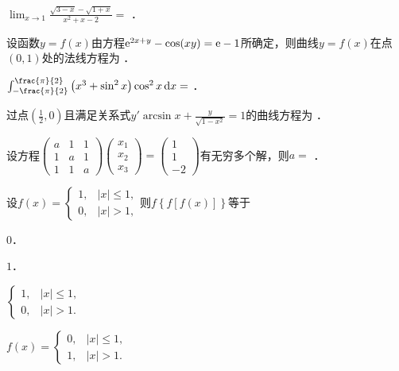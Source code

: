 \documentclass[plain,noanswer,medmath]{../../template/jnuexam}
\begin{document}






\begin{problem}
$\lim_{x \to 1} \frac{\sqrt{3 - x} - \sqrt{1 + x}}{x^2 + x - 2} =$ \fillin{}．
\end{problem}


\begin{problem}
设函数$y = f(x)$由方程$\mathrm{e}^{2x + y} - \cos(xy) = \mathrm{e} - 1$所确定，则曲线$y = f(x)$在点$(0,1)$处的法线方程为 \fillin{}．
\end{problem}


\begin{problem}
$\int_{- \frac{\pi}{2}}^{\frac{\pi}{2}} \left(x^3 + \sin^2 x \right) \cos^2 x\dx =$ \fillin{}．
\end{problem}


\begin{problem}
过点$\left(\frac{1}{2},0 \right)$且满足关系式$y'\arcsin x + \frac{y}{\sqrt{1 - x^2}} = 1$的曲线方程为 \fillin{}．
\end{problem}


\begin{problem}
设方程$\begin{pmatrix}
  a & 1 & 1 \\
  1 & a & 1 \\
  1 & 1 & a
\end{pmatrix}\begin{pmatrix}
  x_1 \\
  x_2 \\
  x_3
\end{pmatrix} = \begin{pmatrix}
  1 \\
  1 \\
  -2
\end{pmatrix}$有无穷多个解，则$a =$ \fillin{}．
\end{problem}




\begin{problem}
设$f(x) = \begin{cases}
  1, & |x| \le 1, \\
  0, & |x| > 1,
\end{cases}$则$f\left\{f\left[f(x) \right] \right\}$等于\pickout{}
\begin{abcd}
\item $0$．
\item $1$．
\item $\begin{cases}
  1, & |x| \le 1, \\
  0, & |x| > 1.
\end{cases}$
\item $f(x) = \begin{cases}
  0, & |x| \le 1, \\
  1, & |x| > 1.
\end{cases}$
\end{abcd}
\end{problem}
\end{document}
